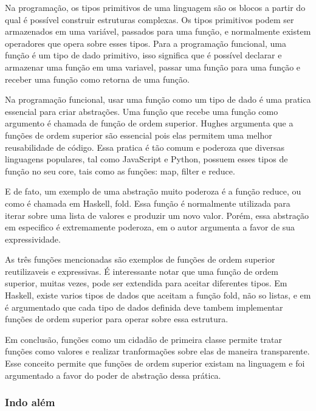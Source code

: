 Na programação, os tipos primitivos de uma linguagem são os blocos a partir do qual é possível construir estruturas complexas.
Os tipos primitivos podem ser armazenados em uma variável, passados para uma função, e normalmente existem operadores que opera sobre esses tipos.
Para a programação funcional, uma função é um tipo de dado primitivo, isso significa que é possível declarar e armazenar uma função em uma variavel, passar uma função para uma função e receber uma função como retorna de uma função.

Na programação funcional, usar uma função como um tipo de dado é uma pratica essencial para criar abstrações.
Uma função que recebe uma função como argumento é chamada de função de ordem superior.
Hughes \cite{whyfpm} argumenta que a funções de ordem superior são essencial pois elas permitem uma melhor reusabilidade de código.
Essa pratica é tão comum e poderoza que diversas linguagens populares, tal como JavaScript e Python, possuem esses tipos de função no seu core, tais como as funções: map, filter e reduce.

E de fato, um exemplo de uma abstração muito poderoza é a função reduce, ou como é chamada em Haskell, fold.
Essa função é normalmente utilizada para iterar sobre uma lista de valores e produzir um novo valor.
Porém, essa abstração em especifico é extremamente poderoza, em \cite{graham} o autor argumenta a favor de sua expressividade.

As três funções mencionadas são exemplos de funções de ordem superior reutilizaveis e expressivas.
É interessante notar que uma função de ordem superior, muitas vezes, pode ser extendida para aceitar diferentes tipos.
Em Haskell, existe varios tipos de dados que aceitam a função fold, não so listas, e em \cite{whyfpm} é argumentado que cada tipo de dados definida deve tambem implementar funções de ordem superior para operar sobre essa estrutura.


Em conclusão, funções como um cidadão de primeira classe permite tratar funções como valores e realizar tranformações sobre elas de maneira transparente.
Esse conceito permite que funções de ordem superior existam na linguagem e foi argumentado a favor do poder de abstração dessa prática.

\subsubsection{Indo além}

